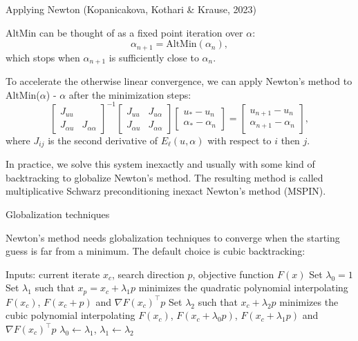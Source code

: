 \documentclass[10pt]{beamer}
\begin{document}
\begin{frame}{Applying Newton (Kopanicakova, Kothari \& Krause, 2023)}

AltMin can be thought of as a fixed point iteration over $\alpha$:
\begin{equation*}
	\alpha_{n+1} = \text{AltMin}(\alpha_n),
\end{equation*}
which stops when $\alpha_{n+1}$ is sufficiently close to $\alpha_n$.

To accelerate the otherwise linear convergence, we can apply Newton's method to AltMin($\alpha$) - $\alpha$ after the minimization steps:
\begin{equation*}
	\begin{bmatrix} J_{uu} \\ J_{\alpha u} & J_{\alpha \alpha} \end{bmatrix}^{-1} \begin{bmatrix} J_{uu} & J_{u \alpha} \\ J_{\alpha u} & J_{\alpha \alpha} \end{bmatrix} \begin{bmatrix} u_* - u_n \\ \alpha_* - \alpha_n \end{bmatrix} = \begin{bmatrix} u_{n+1} - u_n \\ \alpha_{n+1} - \alpha_n \end{bmatrix},
\end{equation*}
where $J_{ij}$ is the second derivative of $E_\ell(u,\alpha)$ with respect to $i$ then $j$.

In practice, we solve this system inexactly and usually with some kind of backtracking to globalize Newton's method.
The resulting method is called multiplicative Schwarz preconditioning inexact Newton's method (MSPIN).
\end{frame}

\begin{frame}{Globalization techniques}

Newton's method needs globalization techniques to converge when the starting guess is far from a minimum.
The default choice is cubic backtracking:
\begin{algorithm}[H]
\caption{Cubic backtracking}
\begin{algorithmic}[1]
\State Inputs: current iterate $x_c$, search direction $p$, objective function $F(x)$
\State Set $\lambda_0 = 1$
\State Set $\lambda_1$ such that $x_p = x_c + \lambda_1 p$ minimizes the quadratic polynomial interpolating $F(x_c)$, $F(x_c + p)$ and $\nabla F(x_c)^\top p$
	\State Set $\lambda_2$ such that $x_c + \lambda_2 p$ minimizes the cubic polynomial interpolating $F(x_c)$, $F(x_c + \lambda_0 p)$, $F(x_c + \lambda_1 p)$ and $\nabla F(x_c)^\top p$
	\State $\lambda_0 \gets \lambda_1$, $\lambda_1 \gets \lambda_2$
\EndWhile
\end{algorithmic}
\end{algorithm}
\end{frame}
\end{document}
